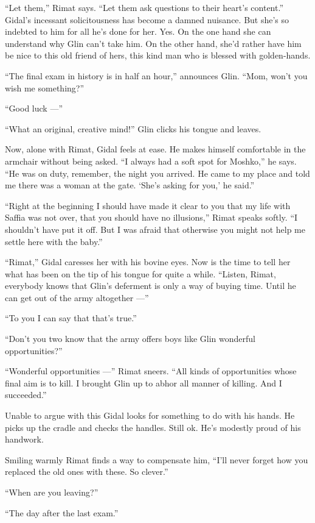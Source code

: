 \documentclass[twoside,11pt,openany]{book}
\begin{document}
``Let them,'' Rimat says. ``Let them ask questions to their heart's
content.'' Gidal's incessant solicitousness has become a damned nuisance. But she's so indebted to him for
all he's done for her. Yes. On the one hand she can understand why Glin can't take him. On the other hand, she'd rather
have him be nice to this old friend of hers, this kind man who is blessed with golden-hands.

``The final exam in history is in half an hour,'' announces Glin. ``Mom, won't
you wish me something?''

``Good luck ---''

``What an original, creative mind!'' Glin clicks his tongue and leaves.

Now, alone with Rimat, Gidal feels at ease. He makes himself comfortable in the armchair without being asked.
``I always had a soft spot for Moshko,'' he says. ``He was on duty, remember,
the night you arrived. He came to my place and told me there was a woman at the gate. `She's asking for you,' he said.''

``Right at the beginning I should have made it clear to you that my life with Saffia was not over, that you
should have no illusions,'' Rimat speaks softly. ``I shouldn't have put it off. But I was afraid that otherwise you
might not help me settle here with the baby.''

``Rimat,'' Gidal caresses her with his bovine eyes. Now is the time to tell her what has been
on the tip of his tongue for quite{ }a while. ``Listen, Rimat, everybody knows that Glin's
deferment is only a way of buying time. Until he can get out of the army altogether ---''

``To you I can say that that's true.''

``Don't you two know that the army offers boys like Glin wonderful opportunities?''

``Wonderful opportunities ---'' Rimat sneers. ``All kinds of opportunities whose
final aim is to kill. I brought Glin up to abhor all manner of killing. And I succeeded.''

Unable to argue with this Gidal looks for something to do with his hands. He picks up the cradle and checks the handles.
Still ok. He's modestly proud of his handwork.

Smiling warmly Rimat finds a way to compensate him, ``I'll never forget how you replaced the old ones with
these. So clever.''

``When are you leaving?''

``The day after the last exam.''
\end{document}
